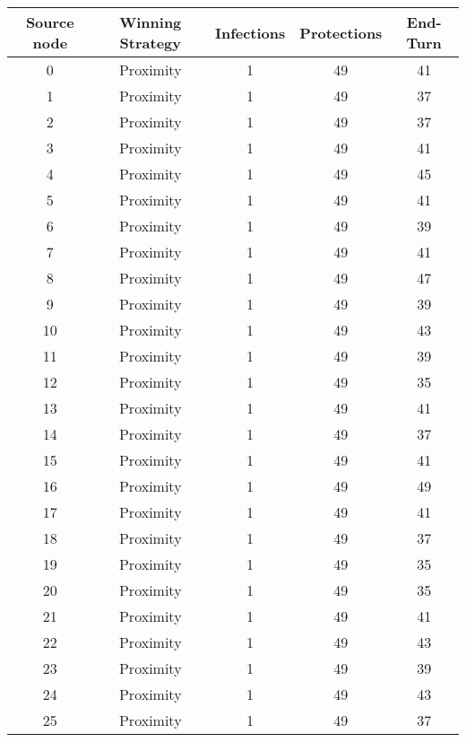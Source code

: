 \documentclass[results.tex]{subfiles}
\begin{document}
\begin{center}
  \begin{tabular}{| c || c | c | c | c |}
    \hline
    {\bfseries Source node} & {\bfseries Winning Strategy} & {\bfseries Infections} & {\bfseries Protections} & {\bfseries End-Turn} \\  %
    \hline\hline
    0 & Proximity & 1 & 49 & 41 \\ 
    \hline
    1 & Proximity & 1 & 49 & 37 \\ 
    \hline
    2 & Proximity & 1 & 49 & 37 \\ 
    \hline
    3 & Proximity & 1 & 49 & 41 \\ 
    \hline
    4 & Proximity & 1 & 49 & 45 \\ 
    \hline
    5 & Proximity & 1 & 49 & 41 \\ 
    \hline
    6 & Proximity & 1 & 49 & 39 \\ 
    \hline
    7 & Proximity & 1 & 49 & 41 \\ 
    \hline
    8 & Proximity & 1 & 49 & 47 \\ 
    \hline
    9 & Proximity & 1 & 49 & 39 \\ 
    \hline
    10 & Proximity & 1 & 49 & 43 \\ 
    \hline
    11 & Proximity & 1 & 49 & 39 \\ 
    \hline
    12 & Proximity & 1 & 49 & 35 \\ 
    \hline
    13 & Proximity & 1 & 49 & 41 \\ 
    \hline
    14 & Proximity & 1 & 49 & 37 \\ 
    \hline
    15 & Proximity & 1 & 49 & 41 \\ 
    \hline
    16 & Proximity & 1 & 49 & 49 \\ 
    \hline
    17 & Proximity & 1 & 49 & 41 \\ 
    \hline
    18 & Proximity & 1 & 49 & 37 \\ 
    \hline
    19 & Proximity & 1 & 49 & 35 \\ 
    \hline
    20 & Proximity & 1 & 49 & 35 \\ 
    \hline
    21 & Proximity & 1 & 49 & 41 \\ 
    \hline
    22 & Proximity & 1 & 49 & 43 \\ 
    \hline
    23 & Proximity & 1 & 49 & 39 \\ 
    \hline
    24 & Proximity & 1 & 49 & 43 \\ 
    \hline
    25 & Proximity & 1 & 49 & 37 \\ 

\end{tabular}
\end{center}
\end{document}
